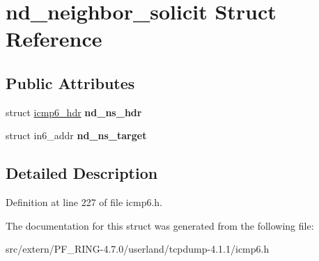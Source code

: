 \hypertarget{structnd__neighbor__solicit}{
\section{nd\_\-neighbor\_\-solicit Struct Reference}
\label{structnd__neighbor__solicit}
}
\subsection*{Public Attributes}
\begin{DoxyCompactItemize}
\item 
\hypertarget{structnd__neighbor__solicit_a5280c724a8f263c8bf832f1b68a31eb2}{
struct \hyperlink{structicmp6__hdr}{icmp6\_\-hdr} {\bfseries nd\_\-ns\_\-hdr}}
\label{structnd__neighbor__solicit_a5280c724a8f263c8bf832f1b68a31eb2}

\item 
\hypertarget{structnd__neighbor__solicit_ae320621e6fd4c738f0e56f938a31171a}{
struct in6\_\-addr {\bfseries nd\_\-ns\_\-target}}
\label{structnd__neighbor__solicit_ae320621e6fd4c738f0e56f938a31171a}

\end{DoxyCompactItemize}


\subsection{Detailed Description}


Definition at line 227 of file icmp6.h.



The documentation for this struct was generated from the following file:\begin{DoxyCompactItemize}
\item 
src/extern/PF\_\-RING-\/4.7.0/userland/tcpdump-\/4.1.1/icmp6.h\end{DoxyCompactItemize}
